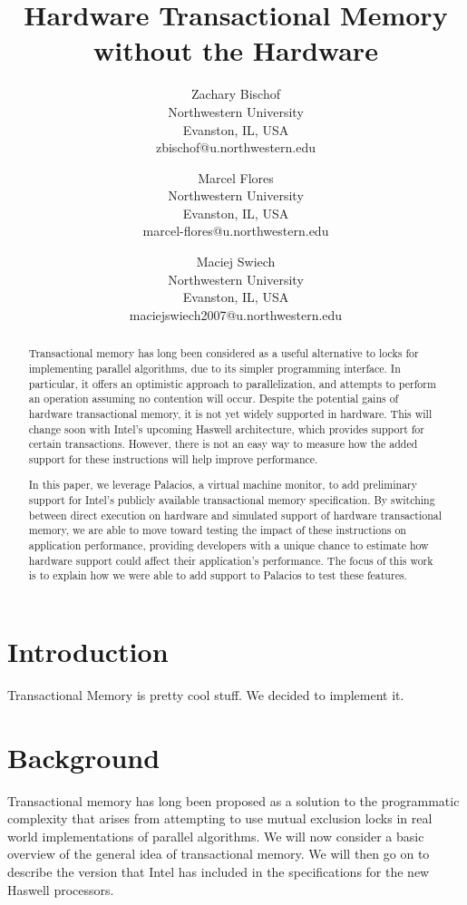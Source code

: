 \documentclass{acm_proc_article-sp}
\title{Hardware Transactional Memory without the Hardware}
\author{Zachary Bischof \\
	Northwestern University\\
	Evanston, IL, USA\\
	zbischof@u.northwestern.edu
	\and 
	Marcel Flores \\
	Northwestern University\\
	Evanston, IL, USA\\
	marcel-flores@u.northwestern.edu
	\and
	Maciej Swiech \\
	Northwestern University\\
	Evanston, IL, USA\\
	maciejswiech2007@u.northwestern.edu
	}
\begin{document}
\maketitle

\begin{abstract} 

Transactional memory has long been considered as a useful alternative to locks
for implementing parallel algorithms, due to its simpler programming interface.
In particular, it offers an optimistic approach to parallelization, and
attempts to perform an operation assuming no contention will occur. Despite the
potential gains of hardware transactional memory, it is not yet widely
supported in hardware. This will change soon with Intel's upcoming Haswell
architecture, which provides support for certain transactions. However, there
is not an easy way to measure how the added support for these instructions will
help improve performance.

In this paper, we leverage Palacios, a virtual machine monitor, to add
preliminary support for Intel's publicly available transactional memory
specification. By switching between direct execution on hardware and simulated
support of hardware transactional memory, we are able to move toward testing the impact of
these instructions on application performance, providing developers with a
unique chance to estimate how hardware support could affect their application's
performance. The focus of this work is to explain how we were able to add
support to Palacios to test these features.


\end{abstract}

\section{Introduction}
Transactional Memory is pretty cool stuff. We decided to implement it.

\section{Background}
Transactional memory has long been proposed as a solution to the programmatic 
complexity that arises from attempting to use mutual exclusion locks in real world 
implementations of parallel algorithms. We will now consider a basic overview 
of the general idea of transactional memory. We will then go on to describe the
 version that Intel has included in the specifications for the new Haswell 
processors.
\end{document}
